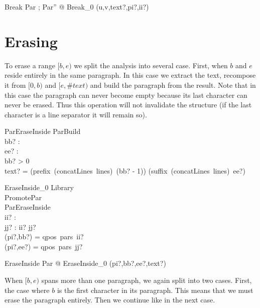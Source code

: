 \documentclass{article}
\begin{document}
\begin{zed}
Break  \exists \Delta Par ; Par'' @ Break\_0 \hide (u,v,text?,pi?,ii?)
\end{zed}

\section{Erasing}

To erase a range $[b,e)$ we split the analysis into several case. First, when $b$ and $e$ reside entirely in the same paragraph. In this case we extract the text, recompose it from $[0,b)$ and $[e, \#text)$ and build the paragraph from the result. Note that in this case the paragraph can never become empty because its last character can never be erased. Thus this operation will not invalidate the structure (if the last character is a line separator it will remain so).

\begin{schema}{ParEraseInside}
	ParBuild \\
	bb? : \nat \\
	ee? : \nat \\
\where
	bb? > 0 \\
	text? = (prefix~(concatLines~lines)~(bb? - 1)) \cat (suffix~(concatLines~lines)~ee?) \\
\end{schema}

\begin{schema}{EraseInside\_0}
	\Delta Library \\
	PromotePar \\
	ParEraseInside \\
	ii? : \nat \\
	jj? : \nat 
	\where
	ii? \leq jj? \\
	(pi?,bb?) = qpos~pars~ii? \\
	(pi?,ee?) = qpos~pars~jj? \\
\end{schema}

\begin{zed}
	EraseInside  \exists \Delta Par @ EraseInside\_0 \hide (pi?,bb?,ee?,text?)
\end{zed}

When $[b,e)$ spans more than one paragraph, we again split into two cases. First, the case where $b$ is the first character in its paragraph. This means that we must erase the paragraph entirely. Then we continue like in the next case.
\end{document}
